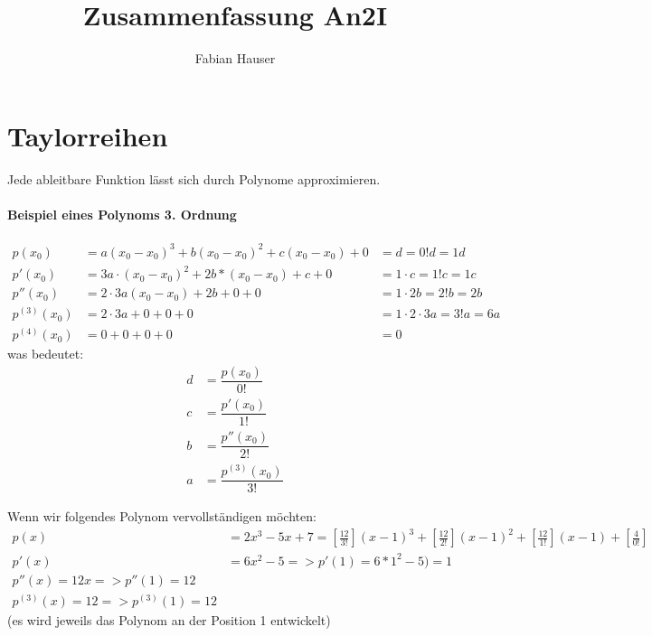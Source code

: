 %


\title{Zusammenfassung An2I}
\author{Fabian Hauser}
 
 \newcommand{\dt}{\text{ }\mathrm{d}t}
 

\maketitle

\section{Taylorreihen}
Jede ableitbare Funktion lässt sich durch Polynome approximieren.


\paragraph{Beispiel eines Polynoms 3. Ordnung}
\begin{align*}
	p(x_0) & = a(x_0-x_0)^3 + b(x_0-x_0)^2 + c(x_0-x_0) + 0 &= d = 0!d = 1d \\
	p'(x_0) &= 3a \cdot (x_0-x_0)^2 + 2b * (x_0-x_0) + c + 0 &= 1 \cdot c = 1!c = 1c \\
	p''(x_0) &= 2 \cdot 3a (x_0-x_0) + 2b + 0 + 0 &= 1 \cdot 2b = 2!b = 2b \\
	p^{(3)}(x_0) &= 2 \cdot 3a + 0 + 0 + 0 &= 1 \cdot 2 \cdot 3a = 3!a = 6a \\
	p^{(4)}(x_0) &= 0 + 0 + 0 + 0 &= 0
\end{align*}
was bedeutet:
\begin{align*}
	d &= \dfrac{p(x_0)}{0!} \\
	c &= \dfrac{p'(x_0)}{1!} \\
	b &= \dfrac{p''(x_0)}{2!} \\
	a &= \dfrac{p^{(3)}(x_0)}{3!}
\end{align*}

Wenn wir folgendes Polynom vervollständigen möchten:
\begin{align*}
	p(x) &= 2x^3 - 5x + 7 = [\frac{12}{3!}](x-1)^3 + [\frac{12}{2!}](x-1)^2 + [\frac{12}{1!}](x-1) + [\frac{4}{0!}] \\
	p'(x) &= 6x^2 - 5 => p'(1) = 6 * 1^2 -5 ) =1 \\
	p''(x) = 12x => p''(1) = 12 \\
	p^{(3)}(x) = 12 => p^{(3)}(1) = 12
\end{align*}
(es wird jeweils das Polynom an der Position 1 entwickelt)

